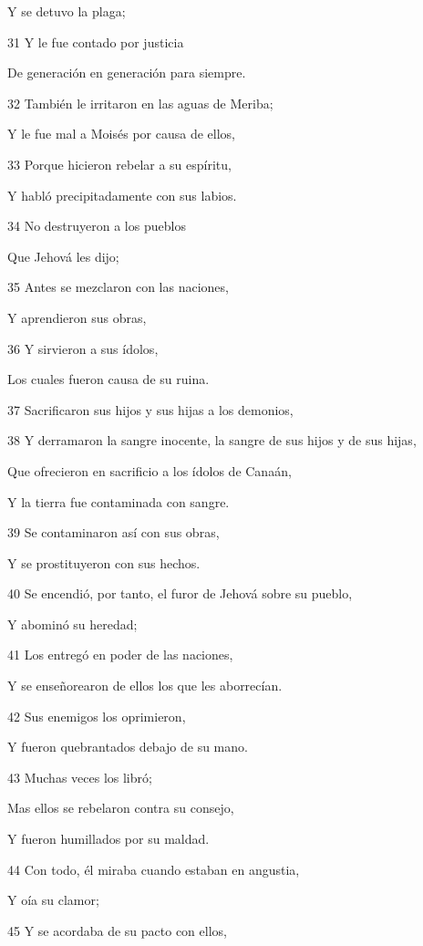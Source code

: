 \par Y se detuvo la plaga;
\par 31 Y le fue contado por justicia
\par De generación en generación para siempre.
\par 32 También le irritaron en las aguas de Meriba;
\par Y le fue mal a Moisés por causa de ellos,
\par 33 Porque hicieron rebelar a su espíritu,
\par Y habló precipitadamente con sus labios.
\par 34 No destruyeron a los pueblos
\par Que Jehová les dijo;
\par 35 Antes se mezclaron con las naciones,
\par Y aprendieron sus obras,
\par 36 Y sirvieron a sus ídolos,
\par Los cuales fueron causa de su ruina.
\par 37 Sacrificaron sus hijos y sus hijas a los demonios,
\par 38 Y derramaron la sangre inocente, la sangre de sus hijos y de sus hijas,
\par Que ofrecieron en sacrificio a los ídolos de Canaán,
\par Y la tierra fue contaminada con sangre.
\par 39 Se contaminaron así con sus obras,
\par Y se prostituyeron con sus hechos.
\par 40 Se encendió, por tanto, el furor de Jehová sobre su pueblo,
\par Y abominó su heredad;
\par 41 Los entregó en poder de las naciones,
\par Y se enseñorearon de ellos los que les aborrecían.
\par 42 Sus enemigos los oprimieron,
\par Y fueron quebrantados debajo de su mano.
\par 43 Muchas veces los libró;
\par Mas ellos se rebelaron contra su consejo,
\par Y fueron humillados por su maldad.
\par 44 Con todo, él miraba cuando estaban en angustia,
\par Y oía su clamor;
\par 45 Y se acordaba de su pacto con ellos,
